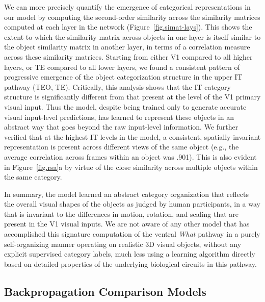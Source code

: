 \documentclass[11pt,twoside]{article}
\newif\myifpdf
\begin{document}
We can more precisely quantify the emergence of categorical representations in our model by computing the second-order similarity across the similarity matrices computed at each layer in the network (Figure~\ref{fig.simat-lays}).  
This shows the extent to which the similarity matrix across objects in one layer is itself similar to the object similarity matrix in another layer, in terms of a correlation measure across these similarity matrices.  Starting from either V1 compared to all higher layers, or TE compared to all lower layers, we found a consistent pattern of progressive emergence of the object categorization structure in the upper IT pathway (TEO, TE).  Critically, this analysis shows that the IT category structure is significantly different from that present at the level of the V1 primary visual input.  Thus the model, despite being trained only to generate accurate visual input-level predictions, has learned to represent these objects in an abstract way that goes beyond the raw input-level information.  We further verified that at the highest IT levels in the model, a consistent, spatially-invariant representation is present across different views of the same object (e.g., the average correlation across frames within an object was .901).  This is also evident in Figure~\ref{fig.rsa}a by virtue of the close similarity across multiple objects within the same category.

In summary, the model learned an abstract category organization that reflects the overall visual shapes of the objects as judged by human participants, in a way that is invariant to the differences in motion, rotation, and scaling that are present in the V1 visual inputs.  We are not aware of any other model that has accomplished this signature computation of the ventral \emph{What} pathway in a purely self-organizing manner operating on realistic 3D visual objects, without any explicit supervised category labels, much less using a learning algorithm directly based on detailed properties of the underlying biological circuits in this pathway.

\subsection{Backpropagation Comparison Models}
\end{document}
